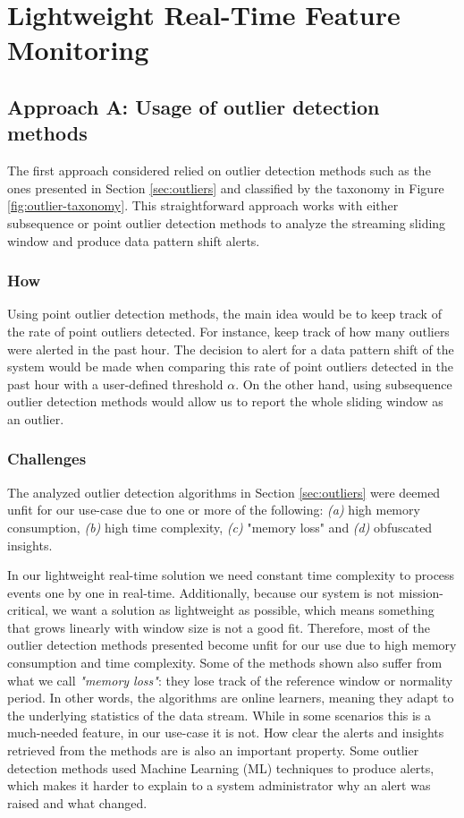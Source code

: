 \chapter{Lightweight Real-Time Feature Monitoring} \label{chap:my-work} \minitoc

\section{Approach A: Usage of outlier detection methods}
The first approach considered relied on outlier detection methods such as the ones presented in Section \ref{sec:outliers} and classified by the taxonomy in Figure \ref{fig:outlier-taxonomy}. This straightforward approach works with either subsequence or point outlier detection methods to analyze the streaming sliding window and produce data pattern shift alerts.

\subsection*{How}

Using point outlier detection methods, the main idea would be to keep track of the rate of point outliers detected. For instance, keep track of how many outliers were alerted in the past hour. The decision to alert for a data pattern shift of the system would be made when comparing this rate of point outliers detected in the past hour with a user-defined threshold $\alpha$. On the other hand, using subsequence outlier detection methods would allow us to report the whole sliding window as an outlier. 


\subsection*{Challenges}
The analyzed outlier detection algorithms in Section \ref{sec:outliers} were deemed unfit for our use-case due to one or more of the following: \textit{(a)} high memory consumption, \textit{(b)} high time complexity, \textit{(c)} "memory loss" and \textit{(d)} obfuscated insights.

In our lightweight real-time solution we need constant time complexity to process events one by one in real-time. Additionally, because our system is not mission-critical, we want a solution as lightweight as possible, which means something that grows linearly with window size is not a good fit. Therefore, most of the outlier detection methods presented become unfit for our use due to high memory consumption and time complexity. Some of the methods shown also suffer from what we call \textit{"memory loss"}: they lose track of the reference window or normality period. In other words, the algorithms are online learners, meaning they adapt to the underlying statistics of the data stream. While in some scenarios this is a much-needed feature, in our use-case it is not. How clear the alerts and insights retrieved from the methods are is also an important property. Some outlier detection methods used Machine Learning (ML) techniques to produce alerts, which makes it harder to explain to a system administrator why an alert was raised and what changed.

